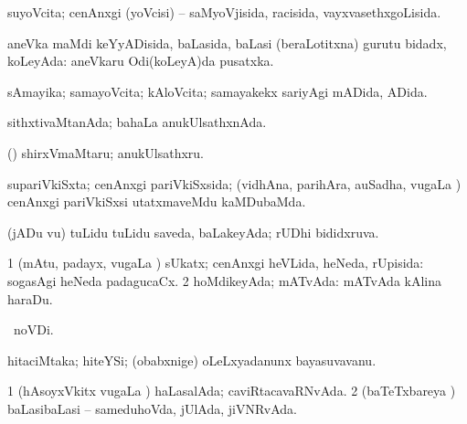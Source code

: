 {{{\bentry
{} 
\gl{\gu}
\expl{}
\bmng
suyoVcita; cenAnxgi (yoVcisi) -- saMyoVjisida, racisida, vayxvasethxgoLisida. 
\emng
\eentry

\bentry
{} 
\gl{\gu}
\expl{}
\bmng
aneVka maMdi keYyADisida, baLasida, baLasi (beraLotitxna) gurutu bidadx, koLeyAda:  aneVkaru Odi(koLeyA)da pusatxka. 
\emng
\eentry

\bentry
{} 
\gl{\gu}
\expl{}
\bmng
sAmayika; samayoVcita; kAloVcita; samayakekx sariyAgi mADida, ADida. 
\emng
\eentry

\bentry
{} 
\gl{\gu}
\expl{}
\bmng
sithxtivaMtanAda; bahaLa anukUlsathxnAda. 
\emng
\eentry

\bentry
{} 
\gl{\nA}
\expl{}
\bmng
(\bava) shirxVmaMtaru; anukUlsathxru. 
\emng
\eentry

\bentry
{} 
\gl{\gu}
\expl{}
\bmng
supariVkiSxta; cenAnxgi pariVkiSxsida; (vidhAna, parihAra, auSadha, \mo vugaLa \vi) cenAnxgi pariVkiSxsi utatxmaveMdu kaMDubaMda. 
\emng
\eentry

\bentry
{} 
\gl{\gu}
\expl{}
\bmng
(jADu \mo vu) tuLidu tuLidu saveda, baLakeyAda; rUDhi bididxruva. 
\emng
\eentry

\bentry
{} 
\gl{\gu}
\expl{}
\bmng
\bnum
\num{1} (mAtu, padayx, \mo vugaLa \vi) sUkatx; cenAnxgi heVLida, heNeda, rUpisida:  sogasAgi heNeda padagucaCx. 
\num{2} hoMdikeyAda; mATvAda:  mATvAda kAlina haraDu. 
\enum
\emng
\eentry

\bentry
{} 
\gl{\gu}
\expl{}
\bmng
{} \pagu\ noVDi. 
\emng
\eentry

\bentry
{} 
\gl{\nA}
\expl{}
\bmng
hitaciMtaka; hiteYSi; (obabxnige) oLeLxyadanunx bayasuvavanu. 
\emng
\eentry

\bentry
{} 
\gl{\gu}
\expl{}
\bmng
\bnum
\num{1} (hAsoyxVkitx \mo vugaLa \vi) haLasalAda; caviRtacavaRNvAda. 
\num{2} (baTeTxbareya \vi) baLasibaLasi -- sameduhoVda, jUlAda, jiVNRvAda. 
\enum
\emng
\eentry

\bentry
{} 
\gl{\nA}
\expl{}
\bmng
{} 
\emng
\eentry

}}}
